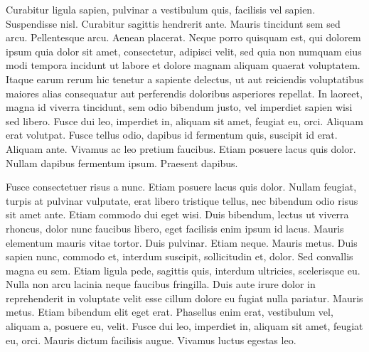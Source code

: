\documentclass[]{article}
\begin{document}
\begin{multicols}{3}
\para
Curabitur ligula sapien, pulvinar a vestibulum quis, facilisis vel
sapien. Suspendisse nisl. Curabitur sagittis hendrerit ante. Mauris
tincidunt sem sed arcu. Pellentesque arcu. Aenean placerat. Neque porro
quisquam est, qui dolorem ipsum quia dolor sit amet, consectetur,
adipisci velit, sed quia non numquam eius modi tempora incidunt ut
labore et dolore magnam aliquam quaerat voluptatem. Itaque earum rerum
hic tenetur a sapiente delectus, ut aut reiciendis voluptatibus maiores
alias consequatur aut perferendis doloribus asperiores repellat. In
laoreet, magna id viverra tincidunt, sem odio bibendum justo, vel
imperdiet sapien wisi sed libero. Fusce dui leo, imperdiet in, aliquam
sit amet, feugiat eu, orci. Aliquam erat volutpat. Fusce tellus odio,
dapibus id fermentum quis, suscipit id erat. Aliquam ante. Vivamus ac
leo pretium faucibus. Etiam posuere lacus quis dolor. Nullam dapibus
fermentum ipsum. Praesent dapibus. 


\para
Fusce consectetuer risus a nunc. Etiam posuere lacus quis dolor. Nullam
feugiat, turpis at pulvinar vulputate, erat libero tristique tellus, nec
bibendum odio risus sit amet ante. Etiam commodo dui eget wisi. Duis
bibendum, lectus ut viverra rhoncus, dolor nunc faucibus libero, eget
facilisis enim ipsum id lacus. Mauris elementum mauris vitae
tortor. Duis pulvinar. Etiam neque. Mauris metus. Duis sapien nunc,
commodo et, interdum suscipit, sollicitudin et, dolor. Sed convallis
magna eu sem. Etiam ligula pede, sagittis quis, interdum ultricies,
scelerisque eu. Nulla non arcu lacinia neque faucibus fringilla. Duis
aute irure dolor in reprehenderit in voluptate velit esse cillum dolore
eu fugiat nulla pariatur. Mauris metus. Etiam bibendum elit eget
erat. Phasellus enim erat, vestibulum vel, aliquam a, posuere eu,
velit. Fusce dui leo, imperdiet in, aliquam sit amet, feugiat eu,
orci. Mauris dictum facilisis augue. Vivamus luctus egestas leo. 


\end{multicols}
\end{document}
